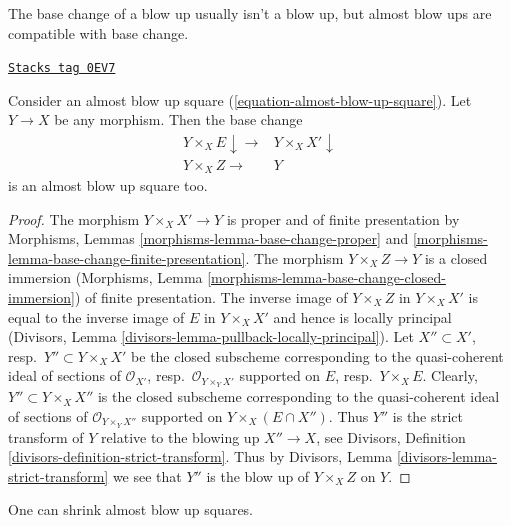 \medskip\noindent
The base change of a blow up usually isn't a blow up,
but almost blow ups are compatible with base change.

\begin{lemma}
\label{flat-lemma-base-change-almost-blow-up}
\href{https://stacks.math.columbia.edu/tag/0EV7}{\texttt{Stacks tag 0EV7}}

Consider an almost blow up square (\ref{equation-almost-blow-up-square}).
Let $Y \to X$ be any morphism. Then the base change
$$
\begin{array}{cc}Y \times_X E \downarrow\longrightarrow & Y \times_X X' \downarrow \\ Y \times_X Z \longrightarrow & Y\end{array}
$$
is an almost blow up square too.
\end{lemma}

\begin{proof}
The morphism $Y \times_X X' \to Y$ is proper and of finite presentation
by Morphisms, Lemmas \ref{morphisms-lemma-base-change-proper} and
\ref{morphisms-lemma-base-change-finite-presentation}.
The morphism $Y \times_X Z \to Y$ is a closed immersion
(Morphisms, Lemma \ref{morphisms-lemma-base-change-closed-immersion}) of
finite presentation. The inverse image of $Y \times_X Z$ in $Y \times_X X'$
is equal to the inverse image of $E$ in $Y \times_X X'$ and hence is
locally principal
(Divisors, Lemma \ref{divisors-lemma-pullback-locally-principal}).
Let $X'' \subset X'$, resp.\ $Y'' \subset Y \times_X X'$ be the closed
subscheme corresponding to the quasi-coherent ideal of sections of
$\mathcal{O}_{X'}$, resp.\ $\mathcal{O}_{Y \times_Y X'}$
supported on $E$, resp.\ $Y \times_X E$.
Clearly, $Y'' \subset Y \times_X X''$ is the closed subscheme
corresponding to the quasi-coherent ideal of sections of
$\mathcal{O}_{Y \times_Y X''}$ supported on $Y \times_X (E \cap X'')$.
Thus $Y''$ is the strict transform of $Y$ relative to the blowing up
$X'' \to X$, see
Divisors, Definition \ref{divisors-definition-strict-transform}.
Thus by Divisors, Lemma \ref{divisors-lemma-strict-transform}
we see that $Y''$ is the blow up of $Y \times_X Z$ on $Y$.
\end{proof}

One can shrink almost blow up squares.

